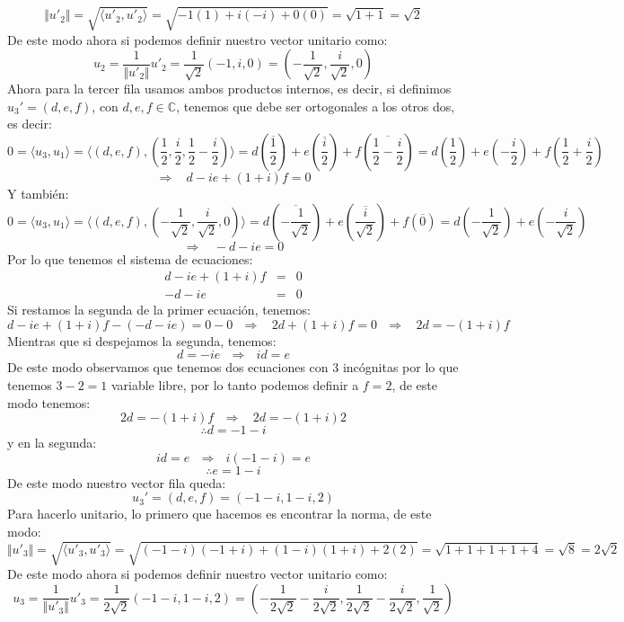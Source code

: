 \begin{itemize}
    \[\Vert u'_2\Vert=\sqrt{\langle u'_2,u'_2\rangle}=\sqrt{-1(1)+i(-i)+0(0)}=\sqrt{1+1}=\sqrt{2}\]
    De este modo ahora si podemos definir nuestro vector unitario como:
    \[u_2=\frac{1}{\Vert u'_2\Vert}u'_2=\frac{1}{\sqrt{2}}(-1,i,0)=\left(-\frac{1}{\sqrt{2}},\frac{i}{\sqrt{2}},0\right)\]
    Ahora para la tercer fila usamos ambos productos internos, es decir, si definimos $u_3'=(d,e,f)$, con $d,e,f\in\mathbb{C}$, tenemos que debe ser ortogonales a los otros dos, es decir:
    \[0=\langle u_3,u_1\rangle=\langle (d,e,f),\left(\frac{1}{2},\frac{i}{2},\frac{1}{2}-\frac{i}{2}\right)\rangle=d\left(\overline{\frac{1}{2}}\right)+e\left(\overline{\frac{i}{2}}\right)+f\left(\overline{\frac{1}{2}-\frac{i}{2}}\right)=d\left(\frac{1}{2}\right)+e\left(-\frac{i}{2}\right)+f\left(\frac{1}{2}+\frac{i}{2}\right)\]
    \[\Longrightarrow~~~~ d-ie+(1+i)f=0\]
    Y tambi\'en:
    \[0=\langle u_3,u_1\rangle=\langle (d,e,f),\left(-\frac{1}{\sqrt{2}},\frac{i}{\sqrt{2}},0\right)\rangle=d\left(\overline{-\frac{1}{\sqrt{2}}}\right)+e\left(\overline{\frac{i}{\sqrt{2}}}\right)+f\left(\overline{0}\right)=d\left(-\frac{1}{\sqrt{2}}\right)+e\left(-\frac{i}{\sqrt{2}}\right)\]
    \[\Longrightarrow~~~~ -d-ie=0\]
    Por lo que tenemos el sistema de ecuaciones:
    \begin{eqnarray*}
    d-ie+(1+i)f&=&0\\
     -d-ie&=&0
     \end{eqnarray*}
     Si restamos la segunda de la primer ecuaci\'on, tenemos:
     \[ d-ie+(1+i)f-(-d-ie)=0-0~~~\Longrightarrow~~~~2d+(1+i)f=0~~~\Longrightarrow~~~~2d=-(1+i)f\]
     Mientras que si despejamos la segunda, tenemos:
     \[d=-ie~~~\Longrightarrow~~~id=e\]
     De este modo observamos que tenemos dos ecuaciones con 3 inc\'ognitas por lo que tenemos $3-2=1$ variable libre, por lo tanto podemos definir a $f=2$, de este modo tenemos:
     \[2d=-(1+i)f~~~\Longrightarrow~~~~2d=-(1+i)2\]
     \[\therefore d= -1-i\]
      y en la segunda:
      \[id=e~~~\Longrightarrow~~~i(-1-i)=e\]
      \[\therefore e=1-i\]
      De este modo nuestro vector fila queda: \[u_3'=(d,e,f)=(-1-i,1-i,2)\]
       Para hacerlo unitario, lo primero que hacemos es encontrar la norma, de este modo:
    \[\Vert u'_3\Vert=\sqrt{\langle u'_3,u'_3\rangle}=\sqrt{(-1-i)(-1+i)+(1-i)(1+i)+2(2)}=\sqrt{1+1+1+1+4}=\sqrt{8}=2\sqrt{2}\]
    De este modo ahora si podemos definir nuestro vector unitario como:
    \[u_3=\frac{1}{\Vert u'_3\Vert}u'_3=\frac{1}{2\sqrt{2}}(-1-i,1-i,2)=\left(-\frac{1}{2\sqrt{2}}-\frac{i}{2\sqrt{2}},\frac{1}{2\sqrt{2}}-\frac{i}{2\sqrt{2}},\frac{1}{\sqrt{2}}\right)\]

\end{itemize}
